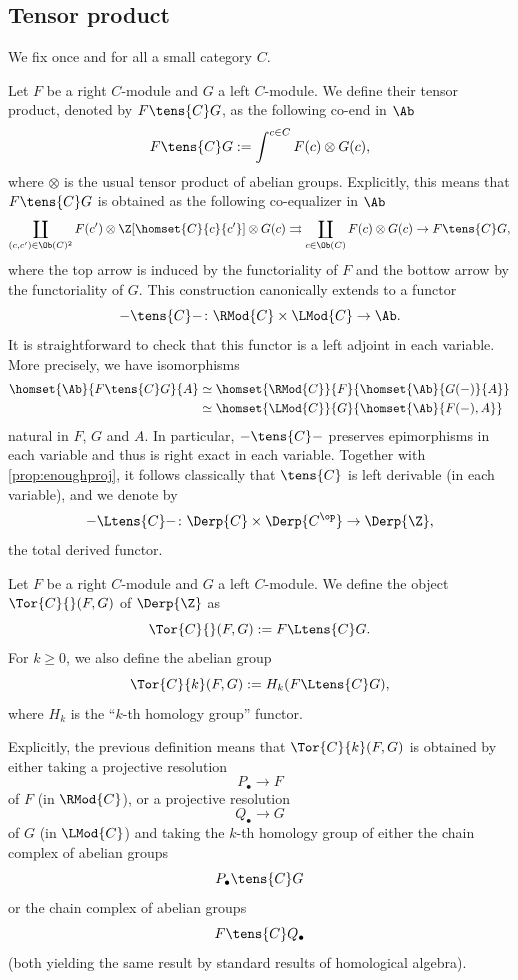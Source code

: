\subsection{Tensor product}
We fix once and for all a small category $C$. 
\begin{paragr}
   Let $F$ be a right $C$\nbd-module and $G$ a left $C$\nbd-module. We
  define their tensor product, denoted by $F\tens{C}G$, as the
  following co-end in $\Ab$
  \[
    F\tens{C}G := \int^{c \in C}F(c)\otimes G(c),
  \]
  where $\otimes$ is the usual tensor product of abelian
  groups. Explicitly, this means that $F\tens{C}G$ is obtained as the following
  co-equalizer in $\Ab$
  \[
    \coprod_{(c,c')\in \Ob(C)^2}F(c')\otimes\Z[\homset{C}{c}{c'}]\otimes
    G(c) \rightrightarrows \coprod_{c \in \Ob(C)}F(c)\otimes G(c)
    \rightarrow F\tens{C}G,
  \]
  where the top arrow is induced by the functoriality of $F$ and the
  bottow arrow by the functoriality of $G$. This construction canonically extends to a functor
  \[
    - \tens{C} - \colon \RMod{C}\times\LMod{C} \to \Ab.
  \]
  It is straightforward to check that this functor is a left adjoint
  in each variable. More precisely, we have isomorphisms
  \[
    \begin{aligned}
      \homset{\Ab}{F\tens{C}G}{A}&\simeq
                                  \homset{\RMod{C}}{F}{\homset{\Ab}{G(-)}{A}}\\
      &\simeq \homset{\LMod{C}}{G}{\homset{\Ab}{F(-),A}}
    \end{aligned}
  \]
  natural in $F$, $G$ and $A$. In particular, $-\tens{C}-$ preserves
  epimorphisms in each variable and thus is right exact in each
  variable. Together with \cref{prop:enoughproj}, it follows
  classically that $\tens{C}$ is left derivable (in each variable),
  and we denote by
  \[
    - \Ltens{C}- \colon \Derp{C}\times \Derp{C^{\op}} \to \Derp{\Z},
  \]
  the total derived functor.
\end{paragr}

\begin{definition}
  Let $F$ be a right $C$\nbd-module and $G$ a left $C$\nbd-module. We
  define the object $\Tor{C}{}(F,G)$ of $\Derp{\Z}$ as
  \[
    \Tor{C}{}(F,G) := F \Ltens{C} G.
  \]
  For $k \geq 0$, we also define the abelian group
  \[
    \Tor{C}{k}(F,G):= H_k(F\Ltens{C}G),
  \]
  where $H_k$ is the ``$k$\nbd-th homology group'' functor.
\end{definition}
\begin{paragr}
  Explicitly, the previous definition means that $\Tor{C}{k}(F,G)$ is
  obtained by either taking a projective resolution
  \[
    P_{\bullet} \to F
  \]
  of $F$ (in $\RMod{C}$), or a projective resolution
  \[
    Q_{\bullet} \to G
  \]
  of $G$ (in $\LMod{C}$) and taking the $k$\nbd-th homology group of
  either the chain complex of abelian groups
  \[P_{\bullet}\tens{C}G\]
  or the chain complex of abelian groups
  \[F\tens{C}Q_{\bullet}\] (both yielding the same result by standard
  results of homological algebra).
\end{paragr}
